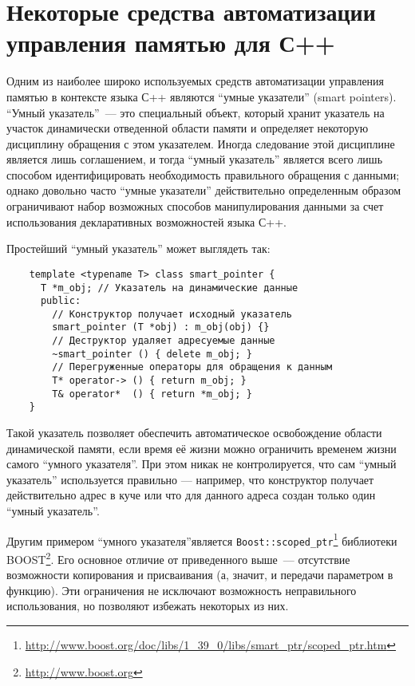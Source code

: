 \section{Некоторые средства автоматизации\\
управления памятью для С++}

Одним из наиболее широко используемых средств автоматизации управления памятью в
контексте языка С++ являются ``умные указатели'' (smart pointers). ``Умный указатель''~---
это специальный объект, который хранит указатель на участок динамически отведенной области
памяти и определяет некоторую дисциплину обращения с этом указателем. Иногда следование
этой дисциплине является лишь соглашением, и тогда ``умный указатель'' является всего лишь
способом идентифицировать необходимость правильного обращения с данными; однако довольно часто
``умные указатели'' действительно определенным образом ограничивают набор возможных
способов манипулирования данными за счет использования декларативных возможностей языка С++.

Простейший ``умный указатель'' может выглядеть так:

\begin{lstlisting}
    template <typename T> class smart_pointer {
      T *m_obj; // Указатель на динамические данные
      public:
        // Конструктор получает исходный указатель 
        smart_pointer (T *obj) : m_obj(obj) {}
        // Деструктор удаляет адресуемые данные
        ~smart_pointer () { delete m_obj; }
        // Перегруженные операторы для обращения к данным
        T* operator-> () { return m_obj; }
        T& operator*  () { return *m_obj; }
    }
\end{lstlisting}

Такой указатель позволяет обеспечить автоматическое освобождение области динамической памяти, если 
время её жизни можно ограничить временем жизни самого ``умного указателя''. При этом никак не
контролируется, что сам ``умный указатель'' используется правильно --- например, что конструктор
получает действительно адрес в куче или что для данного адреса создан только один ``умный указатель''.

Другим примером ``умного указателя''является \lstinline{Boost::scoped_ptr}\footnote{\url{http://www.boost.org/doc/libs/1_39_0/libs/smart_ptr/scoped_ptr.htm}} 
библиотеки BOOST\footnote{\url{http://www.boost.org}}. Его основное отличие от приведенного выше~--- отсутствие возможности копирования и присваивания (а,
значит, и передачи параметром в функцию). Эти ограничения не исключают возможность неправильного использования, но позволяют избежать некоторых из них.

